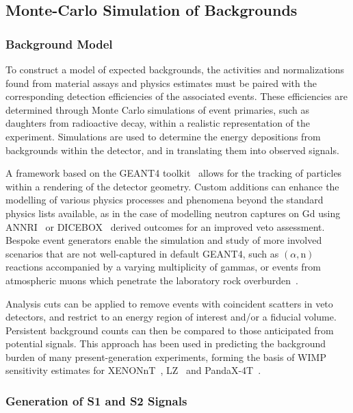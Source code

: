 \subsection{Monte-Carlo Simulation of Backgrounds}

\subsubsection{Background Model} 

To construct a model of expected backgrounds, the activities and normalizations found from material assays and physics estimates must be paired with the corresponding detection efficiencies of the associated events. These efficiencies are determined through Monte Carlo simulations of event primaries, such as daughters from radioactive decay, within a realistic representation of the experiment. Simulations are used to determine the energy depositions from backgrounds within the detector, and in translating them into observed signals.

A framework based on the GEANT4 toolkit~\cite{Agostinelli:2002hh} allows for the tracking of particles within a rendering of the detector geometry. Custom additions can enhance the modelling of various physics processes and phenomena beyond the standard physics lists available, as in the case of modelling neutron captures on Gd using ANNRI~\cite{Hagiwara:2019ptep,Tanaka:2020ptep} or DICEBOX~\cite{Becvar:1998sd} derived outcomes for an improved veto assessment. Bespoke event generators enable the simulation and study of more involved scenarios that are not well-captured in default GEANT4, such as $(\alpha,\mathrm{n})$ reactions accompanied by a varying multiplicity of gammas, or events from atmospheric muons which penetrate the laboratory rock overburden~\cite{Akerib:2021ap}.

Analysis cuts can be applied to remove events with coincident scatters in veto detectors, and restrict to an energy region of interest and/or a fiducial volume. Persistent background counts can then be compared to those anticipated from potential signals. This approach has been used in predicting the background burden of many present-generation experiments, forming the basis of WIMP sensitivity estimates for XENONnT~\cite{Aprile:2020vtw}, LZ~\cite{Akerib:2018lyp} and PandaX-4T~\cite{Zhang:2018scp}. 

\subsubsection{Generation of S1 and S2 Signals}

